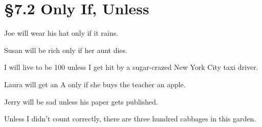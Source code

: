 % 
% 

\section{\S 7.2 Only If, Unless}
\begin{enumerate}

\begin{statement}{Joe will wear his hat only if it rains.}
\end{statement}

\begin{statement}{Susan will be rich only if her aunt dies.}
\end{statement}

\begin{statement}{I will live to be 100 unless I get hit by a sugar-crazed New
    York City taxi driver.}
\end{statement}

\begin{statement}{Laura will get an A only if she buys the teacher an apple.}
\end{statement}

\begin{statement}{Jerry will be sad unless his paper gets published.}
\end{statement}

\begin{statement}{Unless I didn’t count correctly, there are three hundred cabbages in this garden.}
\end{statement}

\end{enumerate}
% 
